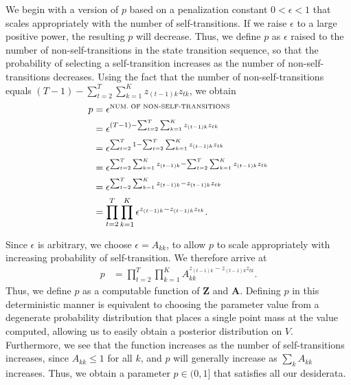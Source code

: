 \documentclass[letterpaper]{article}
\begin{document}
We begin with a version of $p$ based on a penalization constant $0 < \epsilon < 1$ that scales appropriately with the number of self-transitions. If we raise $\epsilon$ to a large positive power, the resulting $p$ will decrease. Thus, we define $p$ as $\epsilon$ raised to the number of non-self-transitions in the state transition sequence, so that the probability of selecting a self-transition increases as the number of non-self-transitions decreases. Using the fact that the number of non-self-transitions equals $(T-1) - \sum^{T}_{t=2}\sum^{K}_{k=1}z_{(t-1)k}z_{tk}$, we obtain 
\begin{align}
    p &= \epsilon^\text{\tiny NUM.\ OF NON-SELF-TRANSITIONS}\\
      &= \epsilon^{(T-1) - \sum^{T}_{t=2}\sum^{K}_{k=1}z_{(t-1)k}z_{tk}} \notag\\
      &= \epsilon^{\sum^{T}_{t=2}1 - \sum^{T}_{t=2}\sum^{K}_{k=1}z_{(t-1)k}z_{tk}} \notag\\
      &= \epsilon^{\sum^{T}_{t=2}\sum^{K}_{k=1}z_{(t-1)k} - \sum^{T}_{t=2}\sum^{K}_{k=1}z_{(t-1)k}z_{tk}} \notag\\
      &= \epsilon^{\sum^{T}_{t=2}\sum^{K}_{k=1}z_{(t-1)k} - z_{(t-1)k}z_{tk}} \notag\\
      &= \prod^{T}_{t=2}\prod_{k=1}^{K}\epsilon^{z_{(t-1)k} - z_{(t-1)k}z_{tk}}. \label{eq:eps-0}
\end{align}

Since $\epsilon$ is arbitrary, we choose $\epsilon = A_{kk}$, to allow $p$ to scale appropriately with increasing probability of self-transition. We therefore arrive at
\begin{align*}
    p &= \prod^{T}_{t=2}\prod^{K}_{k=1}A_{kk}^{z_{(t-1)k} - z_{(t-1)k}z_{tk}}.
\end{align*}
Thus, we define $p$ as a computable function of $\mathbf{Z}$ and $\mathbf{A}$. Defining $p$ in this deterministic manner is equivalent to choosing the parameter value from a degenerate probability distribution that places a single point mass at the value computed, allowing us to easily obtain a posterior distribution on $V$. Furthermore, we see that the function increases as the number of self-transitions increases, since $A_{kk} \leq 1$ for all $k$, and $p$ will generally increase as $\sum_k A_{kk}$ increases. Thus, we obtain a parameter $p \in (0,1]$ that satisfies all our desiderata.
\end{document}
